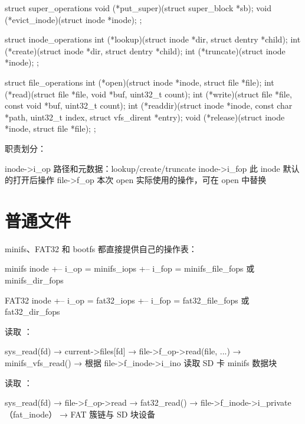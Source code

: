 \begin{ccode}
struct super_operations {
    void (*put_super)(struct super_block *sb);
    void (*evict_inode)(struct inode *inode);
};

struct inode_operations {
    int (*lookup)(struct inode *dir, struct dentry *child);
    int (*create)(struct inode *dir, struct dentry *child);
    int (*truncate)(struct inode *inode);
};

struct file_operations {
    int (*open)(struct inode *inode, struct file *file);
    int (*read)(struct file *file, void *buf, uint32_t count);
    int (*write)(struct file *file, const void *buf, uint32_t count);
    int (*readdir)(struct inode *inode, const char *path,
                   uint32_t index, struct vfs_dirent *entry);
    void (*release)(struct inode *inode, struct file *file);
};
\end{ccode}

职责划分：

\begin{txtcode}
inode->i_op   路径和元数据：lookup/create/truncate
inode->i_fop  此 inode 默认的打开后操作
file->f_op    本次 open 实际使用的操作，可在 open 中替换
\end{txtcode}

\section{普通文件}

minifs、FAT32 和 bootfs 都直接提供自己的操作表：

\begin{txtcode}
minifs inode
+-- i_op  = minifs_iops
+-- i_fop = minifs_file_fops 或 minifs_dir_fops

FAT32 inode
+-- i_op  = fat32_iops
+-- i_fop = fat32_file_fops 或 fat32_dir_fops
\end{txtcode}

读取 ：

\begin{txtcode}
sys_read(fd)
  → current->files[fd]
  → file->f_op->read(file, ...)
  → minifs_vfs_read()
  → 根据 file->f_inode->i_ino 读取 SD 卡 minifs 数据块
\end{txtcode}

读取 ：

\begin{txtcode}
sys_read(fd)
  → file->f_op->read
  → fat32_read()
  → file->f_inode->i_private（fat_inode）
  → FAT 簇链与 SD 块设备
\end{txtcode}

